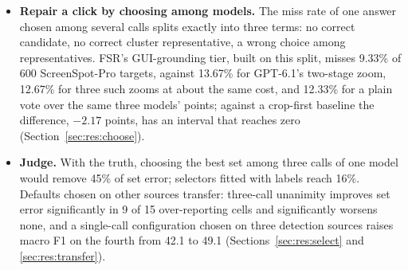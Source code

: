 \begin{itemize}
\item \textbf{Repair a click by choosing among models.} The miss rate of one answer chosen among several calls splits exactly into three terms: no correct candidate, no correct cluster representative, a wrong choice among representatives. FSR's GUI-grounding tier, built on this split, misses 9.33\% of 600 ScreenSpot-Pro targets, against 13.67\% for GPT-6.1's two-stage zoom, 12.67\% for three such zooms at about the same cost, and 12.33\% for a plain vote over the same three models' points; against a crop-first baseline the difference, $-2.17$ points, has an interval that reaches zero (Section~\ref{sec:res:choose}).
\item \textbf{Judge.} With the truth, choosing the best set among three calls of one model would remove 45\% of set error; selectors fitted with labels reach 16\%. Defaults chosen on other sources transfer: three-call unanimity improves set error significantly in 9 of 15 over-reporting cells and significantly worsens none, and a single-call configuration chosen on three detection sources raises macro F1 on the fourth from 42.1 to 49.1 (Sections~\ref{sec:res:select} and \ref{sec:res:transfer}).
\end{itemize}

